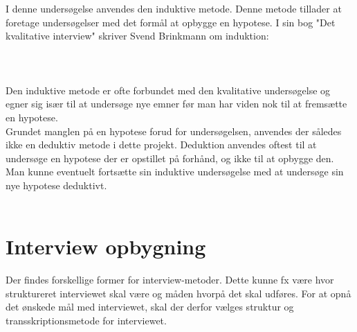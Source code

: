 \\
\\ 
I denne undersøgelse anvendes den induktive metode. Denne metode tillader at foretage undersøgelser med det formål at opbygge en hypotese. 
I sin bog "Det kvalitative interview" skriver Svend Brinkmann om induktion:
\\
\\
 \citep{brinkmann2014}
\\
\\
Den induktive metode er ofte forbundet med den kvalitative undersøgelse og egner sig især til at undersøge nye emner før man har viden nok til at fremsætte en hypotese. 
\\
Grundet manglen på en hypotese forud for undersøgelsen, anvendes der således ikke en deduktiv metode i dette projekt. Deduktion anvendes oftest til at undersøge en hypotese der er opstillet på forhånd, og ikke til at opbygge den. Man kunne eventuelt fortsætte sin induktive undersøgelse med at undersøge sin nye hypotese deduktivt. 
\\
\\



\section{Interview opbygning}
Der findes forskellige former for interview-metoder. Dette kunne fx være hvor struktureret interviewet skal være og måden hvorpå det skal udføres. For at opnå det ønskede mål med interviewet, skal der derfor vælges struktur og transskriptionsmetode for interviewet.

